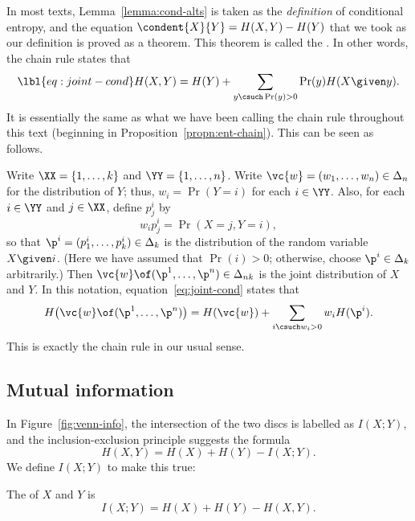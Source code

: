 \begin{remark} 
In most texts, Lemma~\ref{lemma:cond-alts} is
taken as the \emph{definition} of conditional entropy, and the equation
$\condent{X}{Y} = H(X, Y) - H(Y)$ that we took as our definition is proved
as a theorem.  This theorem is called the 
.  In other words, the chain rule states that
% 
\begin{equation}
\lbl{eq:joint-cond}
H(X, Y) 
=
H(Y) + \sum_{y \csuch \Pr(y) > 0} \Pr(y) H(X \given y).
\end{equation}
% 
It is essentially the same as what we have been calling the chain rule
throughout this text (beginning in Proposition~\ref{propn:ent-chain}).
This can be seen as follows.

Write $\XX = \{1, \ldots, k\}$ and $\YY = \{1, \ldots, n\}$.  Write $\vc{w}
= (w_1, \ldots, w_n) \in \Delta_n$ for the distribution of $Y$; thus, $w_i
= \Pr(Y = i)$ for each $i \in \YY$.  Also, for each $i \in \YY$ and $j \in
\XX$, define $p^i_j$ by
\[
w_i p^i_j = \Pr(X = j, Y = i),
\]
so that $\p^i = (p^i_1, \ldots, p^i_k) \in \Delta_k$ is the distribution of
the random variable $X \given i$.  (Here we have assumed that $\Pr(i) > 0$;
otherwise, choose $\p^i \in \Delta_k$ arbitrarily.)  Then $\vc{w} \of
(\p^1, \ldots, \p^n) \in \Delta_{nk}$ is the joint distribution of $X$ and
$Y$.  In this notation, equation~\eqref{eq:joint-cond} states that
\[
H\bigl( \vc{w} \of (\p^1, \ldots, \p^n) \bigr)
=
H(\vc{w}) + \sum_{i \csuch w_i > 0} w_i H(\p^i).
\]
This is exactly the chain rule in our usual sense.  
\end{remark}


\subsection*{Mutual information}

In Figure~\ref{fig:venn-info}, the intersection of the two discs is
labelled as $I(X; Y)$, and the inclusion-exclusion principle suggests the
formula
\[
H(X, Y) = H(X) + H(Y) - I(X; Y).
\]
We define $I(X; Y)$ to make this true:

\begin{defn}
The  of $X$ and $Y$ is
\[
I(X; Y) = H(X) + H(Y) - H(X, Y).
\]
\end{defn}

